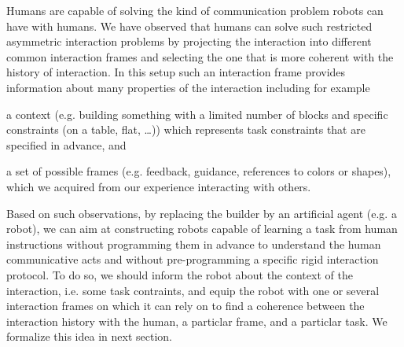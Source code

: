 Humans are capable of solving the kind of communication problem robots can have with humans. We have observed that humans can solve such restricted asymmetric interaction problems by projecting the interaction into different common interaction frames and selecting the one that is more coherent with the history of interaction. In this setup such an interaction frame provides information about many properties of the interaction including for example \begin{inparaenum}[(a)]  \item a context (e.g. building something with a limited number of blocks and specific constraints (on a table, flat, \ldots)) which represents task constraints that are specified in advance, and \item a set of possible frames (e.g. feedback, guidance, references to colors or shapes), which we acquired from our experience interacting with others. \end{inparaenum}

Based on such observations, by replacing the builder by an artificial agent (e.g. a robot), we can aim at constructing robots capable of learning a task from human instructions without programming them in advance to understand the human communicative acts and without pre-programming a specific rigid interaction protocol. To do so, we should inform the robot about the context of the interaction, i.e. some task contraints, and equip the robot with one or several interaction frames on which it can rely on to find a coherence between the interaction history with the human, a particlar frame, and a particlar task. We formalize this idea in next section.

